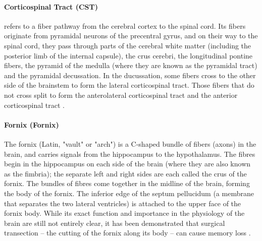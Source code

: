 \documentclass[../structure.tex]{subfiles}
\begin{document}
	
		\paragraph{Corticospinal Tract (CST)}
		refers to a fiber pathway from the cerebral cortex to the spinal cord. Its fibers originate from pyramidal neurons of the precentral gyrus, and on their way to the spinal cord, they pass through parts of the cerebral white matter (including the posterior limb of the internal capsule), the crus cerebri, the longitudinal pontine fibers, the pyramid of the medulla (where they are known as the pyramidal tract) and the pyramidal decussation. In the ducussation, some fibers cross to the other side of the brainstem to form the lateral corticospinal tract. Those fibers that do not cross split to form the anterolateral corticospinal tract and the anterior corticospinal tract \cite{Washington1994}.
		\paragraph{Fornix (Fornix)}
		The fornix (Latin, "vault" or "arch") is a C-shaped bundle of fibers (axons) in the brain, and carries signals from the hippocampus to the hypothalamus.
The fibres begin in the hippocampus on each side of the brain (where they are also known as the fimbria); the separate left and right sides are each called the crus of the fornix. The bundles of fibres come together in the midline of the brain, forming the body of the fornix. The inferior edge of the septum pellucidum (a membrane that separates the two lateral ventricles) is attached to the upper face of the fornix body.
		While its exact function and importance in the physiology of the brain are still not entirely clear, it has been demonstrated that surgical transection – the cutting of the fornix along its body – can cause memory loss \cite{HenryGray1918}. %
		
\end{document}
